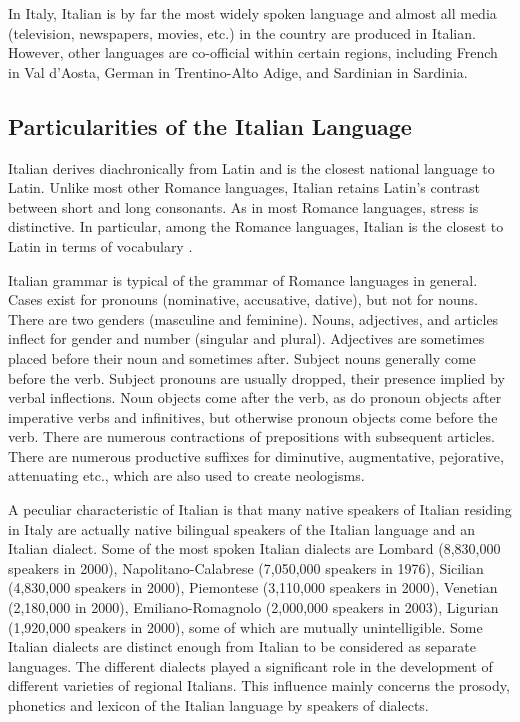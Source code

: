 \begin{multicols}{2}
In Italy, Italian is by far the most widely spoken language and almost all
media (television, newspapers, movies, etc.) in the country are produced
in Italian. However, other languages are co-official within certain regions,
including French in Val d'Aosta, German in Trentino-Alto Adige, and Sardinian
in Sardinia.


\subsection{Particularities of the Italian Language}

Italian derives diachronically from Latin and is the closest national language
to Latin. Unlike most other Romance languages, Italian retains Latin's
contrast between short and long consonants. As in most Romance languages,
stress is distinctive. In particular, among the Romance languages, Italian is
the closest to Latin in terms of vocabulary \cite{ethnologue}.

Italian grammar is typical of the grammar of Romance languages in
general. Cases exist for pronouns (nominative, accusative, dative), but not
for nouns. There are two genders (masculine and feminine). Nouns, adjectives,
and articles inflect for gender and number (singular and plural). Adjectives
are sometimes placed before their noun and sometimes after. Subject nouns
generally come before the verb. Subject pronouns are usually dropped, their
presence implied by verbal inflections. Noun objects come after the verb, as
do pronoun objects after imperative verbs and infinitives, but otherwise
pronoun objects come before the verb. There are numerous contractions of
prepositions with subsequent articles. There are numerous productive suffixes
for diminutive, augmentative, pejorative, attenuating etc., which are also
used to create neologisms.



A peculiar characteristic of Italian is that many native speakers of Italian
residing in Italy are actually native bilingual speakers of the Italian
language and an Italian dialect. Some of the most spoken Italian dialects are
Lombard (8,830,000 speakers in 2000), Napolitano-Calabrese (7,050,000 speakers
in 1976), Sicilian (4,830,000 speakers in 2000), Piemontese (3,110,000
speakers in 2000), Venetian (2,180,000 in 2000), Emiliano-Romagnolo (2,000,000
speakers in 2003), Ligurian (1,920,000 speakers in 2000), some of which are
mutually unintelligible. Some Italian dialects are distinct enough from
Italian to be considered as separate languages. The different dialects played
a significant role in the development of different varieties of regional
Italians. This influence mainly concerns the prosody, phonetics and lexicon of
the Italian language by speakers of dialects.


\end{multicols}
